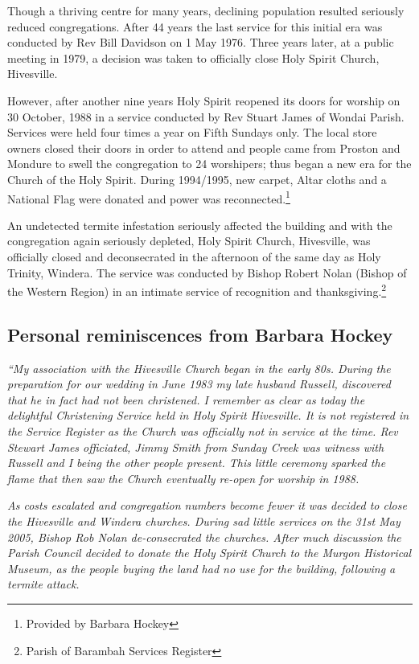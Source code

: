 Though a thriving centre for many years, declining population resulted seriously reduced congregations. After 44 years the last service for this initial era was conducted by Rev Bill Davidson on 1 May 1976. Three years later, at a public meeting in 1979, a decision was taken to officially close Holy Spirit Church, Hivesville.



However, after another nine years Holy Spirit reopened its doors for worship on 30 October, 1988 in a service conducted by Rev Stuart James of Wondai Parish. Services were held four times a year on Fifth Sundays only. The local store owners closed their doors in order to attend and people came from Proston and Mondure to swell the congregation to 24 worshipers; thus began a new era for the Church of the Holy Spirit. During 1994/1995, new carpet, Altar cloths and a National Flag were donated and power was reconnected.\footnote{Provided by Barbara Hockey}


An undetected termite infestation seriously affected the building and with the congregation again seriously depleted, Holy Spirit Church, Hivesville, was officially closed and deconsecrated in the afternoon of the same day as Holy Trinity, Windera. The service was conducted by Bishop Robert Nolan (Bishop of the Western Region) in an intimate service of recognition and thanksgiving.\footnote{Parish of Barambah Services Register}


\subsection{Personal reminiscences from Barbara Hockey}



\emph{``My association with the Hivesville Church began in the early 80s. During the preparation for our wedding in June 1983 my late husband Russell, discovered that he in fact had not been christened. I remember as clear as today the delightful Christening Service held in Holy Spirit Hivesville. It is not registered in the Service Register as the Church was officially not in service at the time. Rev Stewart James officiated, Jimmy Smith from Sunday Creek was witness with Russell and I being the other people present. This little ceremony sparked the flame that then saw the Church eventually re-open for worship in 1988.}



\emph{As costs escalated and congregation numbers become fewer it was decided to close the Hivesville and Windera churches. During sad little services on the 31st May 2005, Bishop Rob Nolan de-consecrated the churches. After much discussion the Parish Council decided to donate the Holy Spirit Church to the Murgon Historical Museum, as the people buying the land had no use for the building, following a termite attack.}



